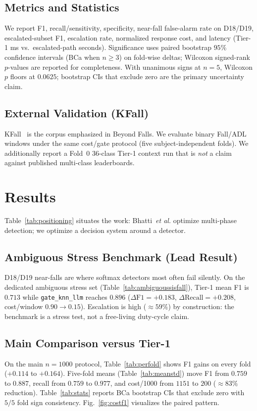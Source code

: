 \documentclass[journal]{IEEEtran}
\begin{document}
\subsection{Metrics and Statistics}
We report F1, recall/sensitivity, specificity, near-fall false-alarm rate on D18/D19, escalated-subset F1, escalation rate, normalized response cost, and latency (Tier-1 ms vs.\ escalated-path seconds). Significance uses paired bootstrap $95\%$ confidence intervals (BCa when $n{\ge}3$) on fold-wise deltas; Wilcoxon signed-rank $p$-values are reported for completeness. With unanimous signs at $n{=}5$, Wilcoxon $p$ floors at $0.0625$; bootstrap CIs that exclude zero are the primary uncertainty claim.

\subsection{External Validation (KFall)}
KFall~\cite{kfall2021} is the corpus emphasized in Beyond Falls. We evaluate binary Fall/ADL windows under the same cost/gate protocol (five subject-independent folds). We additionally report a Fold~0 36-class Tier-1 context run that is \emph{not} a claim against published multi-class leaderboards.

\section{Results}
\label{sec:results}

Table~\ref{tab:positioning} situates the work: Bhatti~\textit{et al.} optimize multi-phase detection; we optimize a decision system around a detector.



\subsection{Ambiguous Stress Benchmark (Lead Result)}
\label{sec:ambiguous}
D18/D19 near-falls are where softmax detectors most often fail silently. On the dedicated ambiguous stress set (Table~\ref{tab:ambiguoussisfall}), Tier-1 mean F1 is $0.713$ while \texttt{gate\_knn\_llm} reaches $0.896$ ($\Delta\text{F1}{=}+0.183$, $\Delta\text{Recall}{=}+0.208$, cost/window $0.90{\rightarrow}0.15$). Escalation is high ($\approx 59\%$) by construction: the benchmark is a stress test, not a free-living duty-cycle claim.



\subsection{Main Comparison versus Tier-1}
On the main $n{=}1000$ protocol, Table~\ref{tab:perfold} shows F1 gains on every fold ($+0.114$ to $+0.164$). Five-fold means (Table~\ref{tab:meanstd}) move F1 from $0.759$ to $0.887$, recall from $0.759$ to $0.977$, and cost/1000 from $1151$ to $200$ ($\approx 83\%$ reduction). Table~\ref{tab:stats} reports BCa bootstrap CIs that exclude zero with $5/5$ fold sign consistency. Fig.~\ref{fig:costf1} visualizes the paired pattern.
\end{document}
